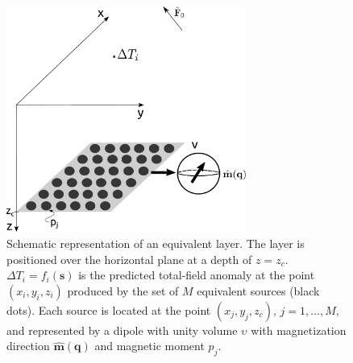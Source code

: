 

\begin{figure}
	\centering
	\includegraphics[width=0.7\textwidth]{Fig/eqlayer_figure.pdf}
	\caption{Schematic representation of an equivalent layer. The layer is positioned over the horizontal plane at a depth of $z=z_c$. $\Delta T_i =  f_i (\mathbf{s})$ is the predicted total-field anomaly at the point $(x_i,y_i,z_i)$ produced by the set of $M$ equivalent sources (black dots). Each source is located at the point $(x_j,y_j,z_c)$, $j = 1,\hdots, M$, and represented by a dipole with unity volume $\upsilon$ with magnetization direction $\hat{\mathbf{m}}(\mathbf{q})$ and magnetic moment $p_j$.    }
	\label{fig:eqlayer_figure}
\end{figure}



